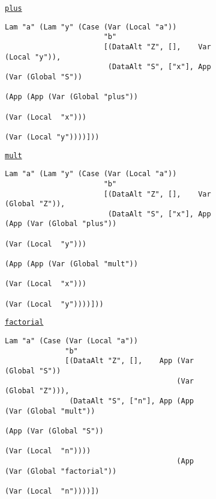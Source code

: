 \begin{figure}
  \begin{subfigure}[plus]{\textwidth}
    \begin{small}
      \underline{\texttt{plus}}
      \begin{verbatim}
Lam "a" (Lam "y" (Case (Var (Local "a"))
                       "b"
                       [(DataAlt "Z", [],    Var (Local "y")),
                        (DataAlt "S", ["x"], App (Var (Global "S"))
                                                 (App (App (Var (Global "plus"))
                                                           (Var (Local  "x")))
                                                      (Var (Local "y"))))]))
      \end{verbatim}
    \end{small}
  \end{subfigure}
  \begin{subfigure}[mult]{\textwidth}
    \begin{small}
      \underline{\texttt{mult}}
      \begin{verbatim}
Lam "a" (Lam "y" (Case (Var (Local "a"))
                       "b"
                       [(DataAlt "Z", [],    Var (Global "Z")),
                        (DataAlt "S", ["x"], App (App (Var (Global "plus"))
                                                      (Var (Local  "y")))
                                                 (App (App (Var (Global "mult"))
                                                           (Var (Local  "x")))
                                                      (Var (Local  "y"))))]))
      \end{verbatim}
    \end{small}
  \end{subfigure}
  \begin{subfigure}[factorial]{\textwidth}
    \begin{small}
      \underline{\texttt{factorial}}
      \begin{verbatim}
Lam "a" (Case (Var (Local "a"))
              "b"
              [(DataAlt "Z", [],    App (Var (Global "S"))
                                        (Var (Global "Z"))),
               (DataAlt "S", ["n"], App (App (Var (Global "mult"))
                                             (App (Var (Global "S"))
                                                  (Var (Local  "n"))))
                                        (App (Var (Global "factorial"))
                                             (Var (Local  "n"))))])
      \end{verbatim}

\end{small}
\end{subfigure}
\end{figure}
